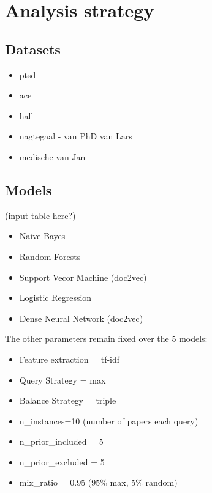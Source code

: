 \documentclass[
]{book}
\providecommand{\tightlist}{%
  \setlength{\itemsep}{0pt}\setlength{\parskip}{0pt}}
\begin{document}
\hypertarget{strategy}{%
\chapter{Analysis strategy}\label{strategy}}

\hypertarget{datasets}{%
\section{Datasets}\label{datasets}}

\begin{itemize}
\tightlist
\item
  ptsd
\item
  ace
\item
  hall
\item
  nagtegaal - van PhD van Lars
\item
  medische van Jan
\end{itemize}

\hypertarget{models}{%
\section{Models}\label{models}}

(input table here?)

\begin{itemize}
\tightlist
\item
  Naive Bayes
\item
  Random Forests
\item
  Support Vecor Machine (doc2vec)
\item
  Logistic Regression
\item
  Dense Neural Network (doc2vec)
\end{itemize}

The other parameters remain fixed over the 5 models:

\begin{itemize}
\tightlist
\item
  Feature extraction = tf-idf
\item
  Query Strategy = max
\item
  Balance Strategy = triple
\item
  n\_instances=10 (number of papers each query)
\item
  n\_prior\_included = 5
\item
  n\_prior\_excluded = 5
\item
  mix\_ratio = 0.95 (95\% max, 5\% random)
\end{itemize}
\end{document}

